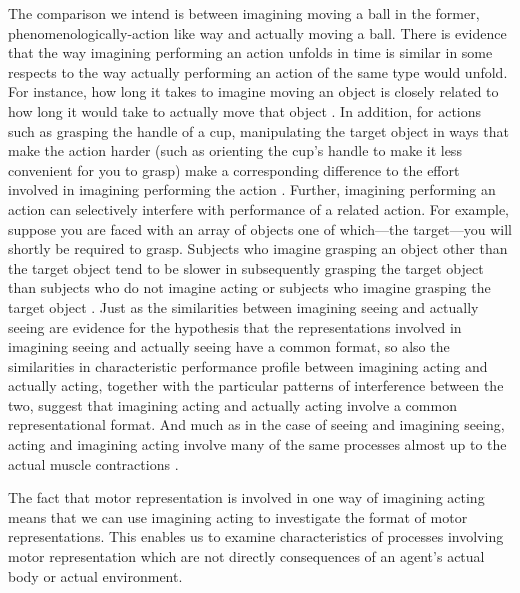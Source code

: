 \documentclass[12pt,\papersize]{extarticle}
\begin{document}
The comparison we intend is between imagining moving a ball in the former, phenomenologically-action like way and actually moving a ball. There is evidence that the way imagining performing an action unfolds in time is similar in some respects to the way actually performing an action of the same type would unfold.  For instance, how long it takes to imagine moving an object is closely related to how long it would take to actually move that object \citep{decety:1989_timing, decety:1996_imagined, Jeannerod:1994oz}. In addition, for actions such as grasping the handle of a cup, manipulating the target object in ways that make the action harder (such as orienting the cup's handle to make it less convenient for you to grasp) make a corresponding difference to the effort involved in imagining performing the action \citep{parsons:1994_temporal, frak:2001_orientation}. Further, imagining performing an action can selectively interfere with performance of a related action. For example, suppose you are faced with an array of objects one of which---the target---you will shortly be required to grasp.  Subjects who imagine grasping an object other than the target object tend to be slower in subsequently grasping the target object than subjects who do not imagine acting or subjects who imagine grasping the target object \citep{ramsey:2010_incongruent_}. Just as the similarities between imagining seeing and actually seeing are evidence for the hypothesis that the representations involved in imagining seeing and actually seeing have a common format, so also the similarities in characteristic performance profile between imagining acting and actually acting, together with the particular patterns of interference between the two, suggest that imagining acting and actually acting involve a common representational format. And much as in the case of seeing and imagining seeing, acting and imagining acting involve many of the same processes almost up to the actual muscle contractions \citep{jeannerod:1995_mental, jeannerod:2003_mechanism}.

The fact that motor representation is involved in one way of imagining acting means that we can use imagining acting to investigate the format of motor representations. This enables us to examine characteristics of processes involving motor representation which are not directly consequences of an agent's actual body or actual environment.  
\end{document}
